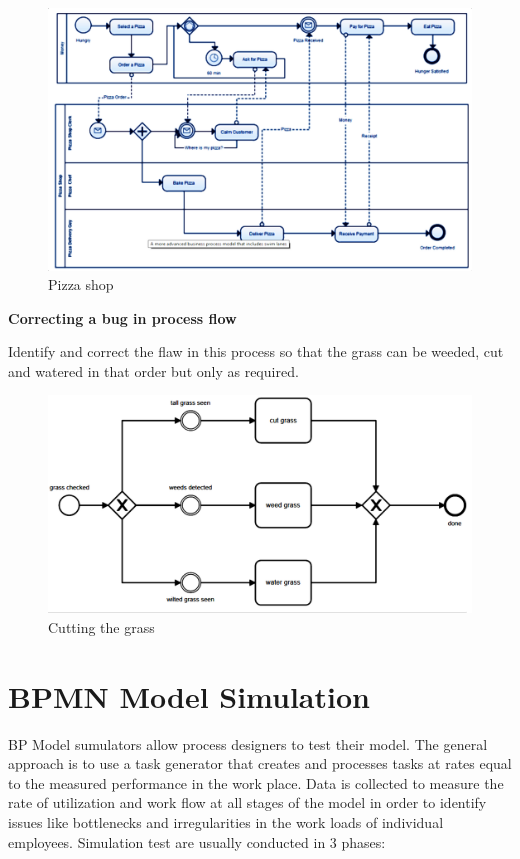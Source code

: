 \documentclass[]{book}
\let\BeginKnitrBlock\begin \let\EndKnitrBlock\end
\begin{document}
\begin{figure}
\centering
\includegraphics{images/pizza2.png}
\caption{Pizza shop}
\end{figure}

\BeginKnitrBlock{rmdexercise}
\textbf{Correcting a bug in process flow}

Identify and correct the flaw in this process so that
the grass can be weeded, cut and watered in that order but only as required.
\EndKnitrBlock{rmdexercise}

\begin{figure}
\centering
\includegraphics{images/cutgrass.png}
\caption{Cutting the grass}
\end{figure}

\hypertarget{bpmn-model-simulation}{%
\section{BPMN Model Simulation}\label{bpmn-model-simulation}}

BP Model sumulators allow process designers to test their model. The general approach is to use a task generator that creates and processes tasks at rates equal to the measured performance in the work place. Data is collected to measure the rate of utilization and work flow at all stages of the model in order to identify issues like bottlenecks and irregularities in the work loads of individual employees. Simulation test are usually conducted in 3 phases:
\end{document}
